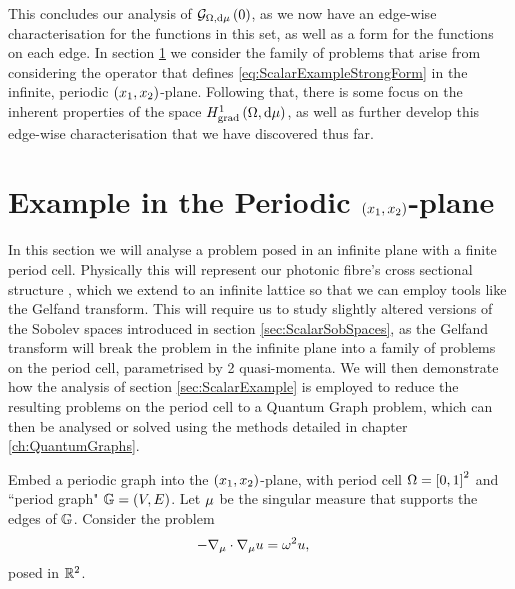 This concludes our analysis of $\mathcal{G}_{ \Omega, \mathrm{d}\mu}\left( 0 \right)$, as we now have an edge-wise characterisation for the functions in this set, as well as a form for the functions on each edge.
In section \ref{sec:ScalarSystem} we consider the family of problems that arise from considering the operator that defines \eqref{eq:ScalarExampleStrongForm} in the infinite, periodic $\left( x_1,x_2 \right)$-plane.
Following that, there is some focus on the inherent properties of the space $H^1_\mathrm{grad}\left( \Omega, \mathrm{d}\mu \right)$, as well as further develop this edge-wise characterisation that we have discovered thus far.

\section{Example in the Periodic $\left( x_1,x_2 \right)$-plane} \label{sec:ScalarSystem}
In this section we will analyse a problem posed in an infinite plane with a finite period cell.
Physically this will represent our photonic fibre's cross sectional structure , which we extend to an infinite lattice so that we can employ tools like the Gelfand transform.
This will require us to study slightly altered versions of the Sobolev spaces introduced in section \ref{sec:ScalarSobSpaces}, as the Gelfand transform will break the problem in the infinite plane into a family of problems on the period cell, parametrised by 2 quasi-momenta.
We will then demonstrate how the analysis of section \ref{sec:ScalarExample} is employed to reduce the resulting problems on the period cell to a Quantum Graph problem, which can then be analysed or solved using the methods detailed in chapter \ref{ch:QuantumGraphs}. \newline

Embed a periodic graph into the $\left( x_1,x_2 \right)$-plane, with period cell $\Omega = \left[ 0,1 \right]^2$ and ``period graph" $\mathbb{G}=(V,E)$.
Let $\mu$ be the singular measure that supports the edges of $\mathbb{G}$. 
Consider the problem
\begin{align} \label{eq:WholeSpaceScalarProblem}
	-\nabla_\mu \cdot \nabla_\mu u &= \omega^2 u,
\end{align}
posed in $\mathbb{R}^2$. 

